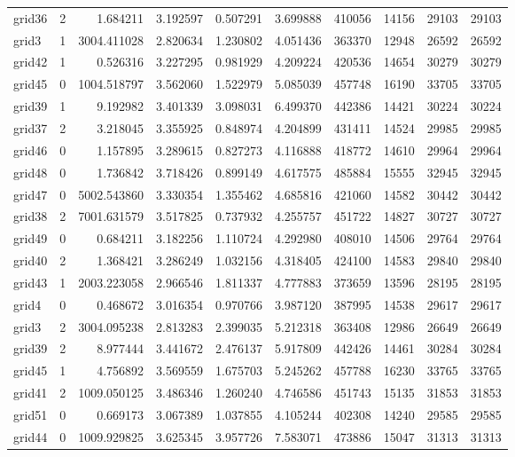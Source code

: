 \begin{longtable}{|l|r|r|r|r|r|r|r|r|r|}
grid36 & 2 & 1.684211 & 3.192597 & 0.507291 & 3.699888 & 410056 & 14156 & 29103 & 29103 \\
grid3 & 1 & 3004.411028 & 2.820634 & 1.230802 & 4.051436 & 363370 & 12948 & 26592 & 26592 \\
grid42 & 1 & 0.526316 & 3.227295 & 0.981929 & 4.209224 & 420536 & 14654 & 30279 & 30279 \\
grid45 & 0 & 1004.518797 & 3.562060 & 1.522979 & 5.085039 & 457748 & 16190 & 33705 & 33705 \\
grid39 & 1 & 9.192982 & 3.401339 & 3.098031 & 6.499370 & 442386 & 14421 & 30224 & 30224 \\
grid37 & 2 & 3.218045 & 3.355925 & 0.848974 & 4.204899 & 431411 & 14524 & 29985 & 29985 \\
grid46 & 0 & 1.157895 & 3.289615 & 0.827273 & 4.116888 & 418772 & 14610 & 29964 & 29964 \\
grid48 & 0 & 1.736842 & 3.718426 & 0.899149 & 4.617575 & 485884 & 15555 & 32945 & 32945 \\
grid47 & 0 & 5002.543860 & 3.330354 & 1.355462 & 4.685816 & 421060 & 14582 & 30442 & 30442 \\
grid38 & 2 & 7001.631579 & 3.517825 & 0.737932 & 4.255757 & 451722 & 14827 & 30727 & 30727 \\
grid49 & 0 & 0.684211 & 3.182256 & 1.110724 & 4.292980 & 408010 & 14506 & 29764 & 29764 \\
grid40 & 2 & 1.368421 & 3.286249 & 1.032156 & 4.318405 & 424100 & 14583 & 29840 & 29840 \\
grid43 & 1 & 2003.223058 & 2.966546 & 1.811337 & 4.777883 & 373659 & 13596 & 28195 & 28195 \\
grid4 & 0 & 0.468672 & 3.016354 & 0.970766 & 3.987120 & 387995 & 14538 & 29617 & 29617 \\
grid3 & 2 & 3004.095238 & 2.813283 & 2.399035 & 5.212318 & 363408 & 12986 & 26649 & 26649 \\
grid39 & 2 & 8.977444 & 3.441672 & 2.476137 & 5.917809 & 442426 & 14461 & 30284 & 30284 \\
grid45 & 1 & 4.756892 & 3.569559 & 1.675703 & 5.245262 & 457788 & 16230 & 33765 & 33765 \\
grid41 & 2 & 1009.050125 & 3.486346 & 1.260240 & 4.746586 & 451743 & 15135 & 31853 & 31853 \\
grid51 & 0 & 0.669173 & 3.067389 & 1.037855 & 4.105244 & 402308 & 14240 & 29585 & 29585 \\
grid44 & 0 & 1009.929825 & 3.625345 & 3.957726 & 7.583071 & 473886 & 15047 & 31313 & 31313 \\

\end{longtable}
